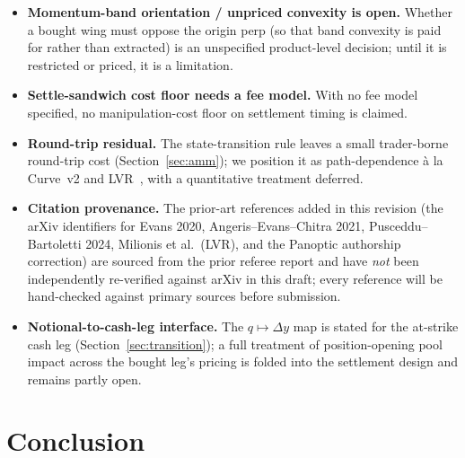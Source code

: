\documentclass[11pt]{article}
\begin{document}
\begin{itemize}[leftmargin=2em]
        counterparty floor, and the carved-equity boundary at liquidation are not
        all closed here. We carry these as open rather than imply a balanced
        ledger.
  \item \textbf{Momentum-band orientation / unpriced convexity is open.} Whether a
        bought wing must oppose the origin perp (so that band convexity is paid
        for rather than extracted) is an unspecified product-level decision; until
        it is restricted or priced, it is a limitation.
  \item \textbf{Settle-sandwich cost floor needs a fee model.} With no fee model
        specified, no manipulation-cost floor on settlement timing is claimed.
  \item \textbf{Round-trip residual.} The state-transition rule leaves a small
        trader-borne round-trip cost (Section~\ref{sec:amm}); we position it as
        path-dependence \`a la Curve~v2 and LVR~\cite{lvr}, with a quantitative
        treatment deferred.
  \item \textbf{Citation provenance.} The prior-art references added in this
        revision (the arXiv identifiers for Evans 2020, Angeris--Evans--Chitra
        2021, Pusceddu--Bartoletti 2024, Milionis et al.\ (LVR), and the Panoptic
        authorship correction) are sourced from the prior referee report and have
        \emph{not} been independently re-verified against arXiv in this draft;
        every reference will be hand-checked against primary sources before
        submission.
  \item \textbf{Notional-to-cash-leg interface.} The $q\mapsto\Delta y$ map is
        stated for the at-strike cash leg (Section~\ref{sec:transition}); a full
        treatment of position-opening pool impact across the bought leg's pricing
        is folded into the settlement design and remains partly open.
\end{itemize}

\section{Conclusion}\label{sec:conclusion}
\end{document}
